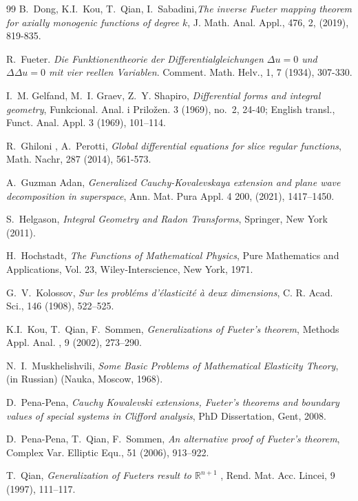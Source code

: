 \documentclass[reqno,11pt]{amsart}
\numberwithin{equation}{section}
\theoremstyle{definition}
\begin{document}
\begin{thebibliography}{99}
		 B.~Dong, K.I.~Kou, T.~Qian, I.~Sabadini,\emph{The inverse Fueter mapping theorem for axially monogenic functions of degree $k$}, J. Math. Anal. Appl., 476, 2, (2019), 819-835.
		
	
		 R.~Fueter. \emph{ Die {F}unktionentheorie der {D}ifferentialgleichungen $\Delta u=0$ und $\Delta \Delta u=0$ mit vier reellen {V}ariablen}. Comment. Math. Helv., 1, 7 (1934), 307-330.
		
		 I.~M. Gelfand, M.~I. Graev, Z.~Y. Shapiro, \emph{Differential forms and integral geometry}, Funkcional. Anal. i Prilo\v zen. 3 (1969), no.~2, 24-40; English transl., Funct. Anal. Appl. 3 (1969), 101–114.
		
  R.~Ghiloni , A.~Perotti, \emph{Global differential equations for slice regular functions}, Math. Nachr, 287 (2014), 561-573.		
		
 A.~Guzman Adan, \emph{Generalized Cauchy-Kovalevskaya extension and plane wave decomposition in superspace}, Ann. Mat. Pura Appl. 4 200, (2021), 1417–1450.
	
	 S.~Helgason, \emph{Integral Geometry and Radon Transforms}, Springer, New York (2011).
	
	 H.~Hochstadt, \emph{The Functions of Mathematical Physics}, Pure Mathematics and Applications, Vol. 23, Wiley-Interscience, New York, 1971.
	
	
	
	    	 G.~V.~Kolossov, \emph{Sur les probléms d'élasticité à deux dimensions}, C. R. Acad. Sci., 146 (1908), 522–525.
	    	
	    	
	    	 K.I.~Kou, T.~Qian, F.~Sommen, \emph{Generalizations of Fueter’s theorem}, Methods Appl. Anal. , 9 (2002), 273–290.
	
	
	 N.~I.~Muskhelishvili, \emph{Some Basic Problems of Mathematical Elasticity Theory}, (in Russian) (Nauka, Moscow, 1968).
	
	 D.~Pena-Pena, \emph{Cauchy Kowalevski extensions, Fueter's theorems and boundary values of special systems in Clifford analysis}, PhD Dissertation, Gent, 2008.
	
	 D.~Pena-Pena, T.~Qian, F.~Sommen, \emph{An alternative proof of Fueter’s theorem}, Complex Var. Elliptic Equ., 51 (2006), 913–922.
	
	
	
	
	    	 T.~Qian, \emph{Generalization of Fueters result to $\mathbb{R}^{n+1}$ }, Rend. Mat. Acc. Lincei, 9 (1997), 111–117.
	    	

\end{thebibliography}
\end{document}
